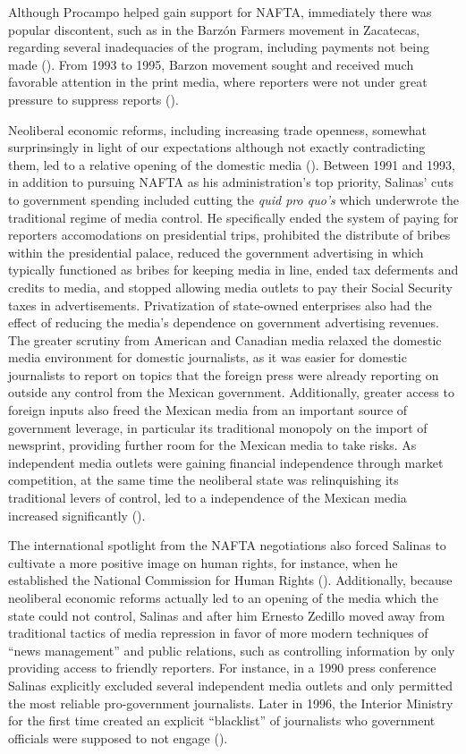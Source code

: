 \documentclass[12pt]{report}
\begin{document}
Although Procampo helped gain support for NAFTA, immediately there was popular discontent, such as
in the Barzón Farmers movement in Zacatecas, regarding several inadequacies of the program,
including payments not being made (\citealt[173]{Williams:2001ux}). From 1993 to 1995, Barzon
movement sought and received much favorable attention in the print media, where reporters were not
under great pressure to suppress reports (\citealt[187]{Williams:2001ux}).

Neoliberal economic reforms, including increasing trade openness, somewhat surprinsingly in light of
our expectations although not exactly contradicting them, led to a relative opening of the domestic
media (\citealt{lawson2002building}). Between 1991 and 1993, in addition to pursuing NAFTA as his
administration's top priority, Salinas' cuts to government spending included cutting the \emph{quid
pro quo's }which underwrote the traditional regime of media control. He specifically ended the
system of paying for reporters accomodations on presidential trips, prohibited the distribute of
bribes within the presidential palace, reduced the government advertising in which typically
functioned as bribes for keeping media in line, ended tax deferments and credits to media, and
stopped allowing media outlets to pay their Social Security taxes in advertisements. Privatization
of state-owned enterprises also had the effect of reducing the media's dependence on government
advertising revenues. The greater scrutiny from American and Canadian media relaxed the domestic
media environment for domestic journalists, as it was easier for domestic journalists to report on
topics that the foreign press were already reporting on outside any control from the Mexican
government. Additionally, greater access to foreign inputs also freed the Mexican media from an
important source of government leverage, in particular its traditional monopoly on the import of
newsprint, providing further room for the Mexican media to take risks. As independent media outlets
were gaining financial independence through market competition, at the same time the neoliberal
state was relinquishing its traditional levers of control, led to a independence of the Mexican
media increased significantly (\citealt[76, 89]{lawson2002building}).

The international spotlight from the NAFTA negotiations also forced Salinas to cultivate a more
positive image on human rights, for instance, when he established the National Commission for Human
Rights (\citealt[107]{Dominguez:2009wd}). Additionally, because neoliberal economic reforms actually
led to an opening of the media which the state could not control, Salinas and after him Ernesto
Zedillo moved away from traditional tactics of media repression in favor of more modern techniques
of ``news management'' and public relations, such as controlling information by only providing
access to friendly reporters. For instance, in a 1990 press conference Salinas explicitly excluded
several independent media outlets and only permitted the most reliable pro-government journalists.
Later in 1996, the Interior Ministry for the first time created an explicit ``blacklist'' of
journalists who government officials were supposed to not engage (\citealt[39]{lawson2002building}).
\end{document}
